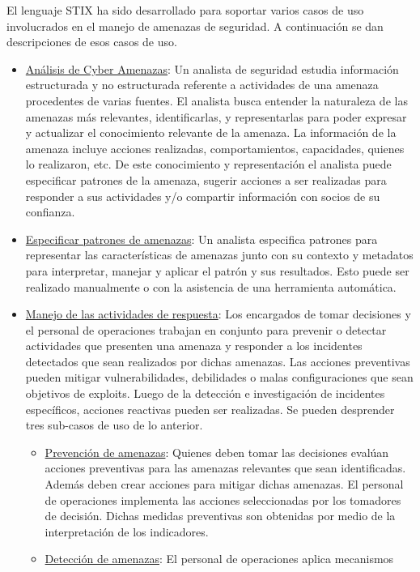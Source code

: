 El lenguaje STIX ha sido desarrollado para soportar varios casos de uso involucrados en el 
manejo de amenazas de seguridad. A continuación se dan descripciones de esos 
casos de uso.
\begin{itemize}
  \item \underline{Análisis de Cyber Amenazas}: Un analista de seguridad estudia información 
  estructurada y no estructurada referente a actividades de una amenaza 
  procedentes de varias fuentes. El analista busca entender la naturaleza de las 
  amenazas más relevantes, identificarlas, y representarlas para poder expresar 
  y actualizar el conocimiento relevante de la amenaza. La información de la 
  amenaza incluye acciones realizadas, comportamientos, capacidades, quienes lo 
  realizaron, etc. De este conocimiento y representación el analista puede 
  especificar patrones de la amenaza, sugerir acciones a ser realizadas para 
  responder a sus actividades y/o compartir información con socios de su 
  confianza.
  \item \underline{Especificar patrones de amenazas}: Un analista especifica patrones para 
  representar las características de amenazas junto con su contexto y metadatos 
  para interpretar, manejar y aplicar el patrón y sus resultados. Esto puede ser 
  realizado manualmente o con la asistencia de una herramienta automática.
  \item \underline{Manejo de las actividades de respuesta}: Los encargados de tomar decisiones y el personal de operaciones trabajan 
  en conjunto para prevenir o detectar actividades que presenten una amenaza y 
  responder a los incidentes detectados que sean realizados por dichas amenazas. 
  Las acciones preventivas pueden mitigar vulnerabilidades, debilidades o malas 
  configuraciones que sean objetivos de exploits. Luego de la detección e 
  investigación de incidentes específicos, acciones reactivas pueden ser 
  realizadas. Se pueden desprender tres sub-casos de uso de lo anterior.
  \begin{itemize}
    \item \underline{Prevención de amenazas}: Quienes deben tomar las decisiones evalúan 
    acciones preventivas para las amenazas relevantes que sean identificadas. Además deben crear acciones para mitigar dichas amenazas. El personal de 
    operaciones implementa las acciones seleccionadas por los tomadores de 
    decisión. Dichas medidas preventivas son obtenidas por medio de la 
    interpretación de los indicadores.
    \item \underline{Detección de amenazas}: El personal de operaciones aplica mecanismos 

\end{itemize}
\end{itemize}
